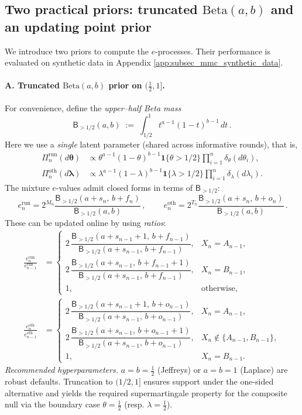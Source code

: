 \subsection{Two practical priors: truncated \texorpdfstring{$\mathrm{Beta}(a,b)$}{Beta(a,b)} and an updating point prior}
\label{subsec:mmc_priors}
We introduce two priors to compute the $e$-processes. Their performance is evaluated on synthetic data in Appendix \ref{app:subsec_mmc_synthetic_data}.



\paragraph{A. Truncated \texorpdfstring{$\mathrm{Beta}(a,b)$}{Beta(a,b)} prior on $(\tfrac12,1]$.}
For convenience, define the \emph{upper–half Beta mass}
\[
\mathsf{B}_{>1/2}(a,b)\;:=\;\int_{1/2}^1 t^{a-1}(1-t)^{b-1}\,dt\,.
\]
Here we use a \emph{single} latent parameter (shared across informative rounds), that is,
\begin{align*}
\Pi_n^{\mathrm{run}}(d\bm\theta)&\propto \theta^{a-1}(1-\theta)^{b-1}\mathbf 1\{\theta>1/2\}\prod_{i=1}^n\delta_\theta(d\theta_i),\\
\Pi_n^{\mathrm{oth}}(d\bm\lambda)&\propto \lambda^{a-1}(1-\lambda)^{b-1}\mathbf 1\{\lambda>1/2\}\prod_{i=1}^n\delta_\lambda(d\lambda_i).
\end{align*}
The mixture $e$-values admit closed forms in terms of $\mathsf{B}_{>1/2}$:
\[
\,e^{\mathrm{run}}_n
= 2^{M_n}\frac{\mathsf{B}_{>1/2}(a+s_n,\,b+f_n)}{\mathsf{B}_{>1/2}(a,b)}\,,\qquad
{\,e^{\mathrm{oth}}_n
= 2^{T_n}\frac{\mathsf{B}_{>1/2}(a+s_n,\,b+o_n)}{\mathsf{B}_{>1/2}(a,b)}\,}.
\]
These can be updated online by using \emph{ratios}:
\begin{align*}
\frac{e^{\mathrm{run}}_n}{e^{\mathrm{run}}_{n-1}}
&=
\begin{cases}
2\,\dfrac{\mathsf{B}_{>1/2}(a+s_{n-1}+1,\,b+f_{n-1})}{\mathsf{B}_{>1/2}(a+s_{n-1},\,b+f_{n-1})},
& X_n=A_{n-1},\\[2mm]
2\,\dfrac{\mathsf{B}_{>1/2}(a+s_{n-1},\,b+f_{n-1}+1)}{\mathsf{B}_{>1/2}(a+s_{n-1},\,b+f_{n-1})},
& X_n=B_{n-1},\\[2mm]
1,&\text{otherwise,}
\end{cases}\\
\frac{e^{\mathrm{oth}}_n}{e^{\mathrm{oth}}_{n-1}}
&=
\begin{cases}
2\,\dfrac{\mathsf{B}_{>1/2}(a+s_{n-1}+1,\,b+o_{n-1})}{\mathsf{B}_{>1/2}(a+s_{n-1},\,b+o_{n-1})},
& X_n=A_{n-1},\\[2mm]
2\,\dfrac{\mathsf{B}_{>1/2}(a+s_{n-1},\,b+o_{n-1}+1)}{\mathsf{B}_{>1/2}(a+s_{n-1},\,b+o_{n-1})},
& X_n\notin\{A_{n-1},B_{n-1}\},\\[2mm]
1,& X_n=B_{n-1}.
\end{cases}
\end{align*}
\emph{Recommended hyperparameters.} $a=b=\tfrac12$ (Jeffreys) or $a=b=1$ (Laplace) are robust defaults.
Truncation to $(1/2,1]$ ensures support under the one-sided alternative and yields the required
supermartingale property for the composite null via the boundary case $\theta=\tfrac12$ (resp. $\lambda=\tfrac12$).




